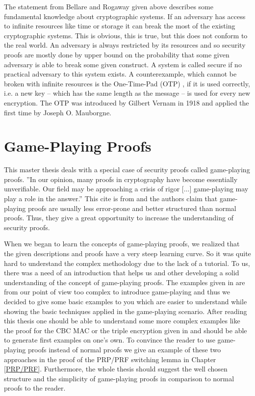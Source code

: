 The statement from Bellare and Rogaway given above describes some fundamental knowledge about cryptographic systems. If an adversary has access to
infinite resources like time or storage it can break the most of the existing cryptographic systems. This is obvious, this is true, but this does not conform to
the real world. An adversary is always restricted by its resources and so security proofs are mostly done by upper bound on the probability that some given
adversary is able to break some given construct. A system is called secure if no practical adversary to this system exists.
A counterexample, which cannot be broken with infinite resources is the One-Time-Pad (OTP) \cite{DBLP:books/sp/voecking2011/Tantau11}, if it is used correctly,
i.e. a new key -- which has the same length as the message -- is used for every new encryption.
The OTP was introduced by Gilbert Vernam in 1918 and applied the first time by Joseph O. Mauborgne.

\section*{Game-Playing Proofs}
This master thesis deals with a special case of security proofs called game-playing proofs. ''In our opinion, many proofs in cryptography have become
essentially unverifiable. Our field may be approaching a crisis of rigor [$\hdots$] game-playing may play a role in the answer.''
This cite is from \cite{DBLP:conf/eurocrypt/BellareR06} and the authors claim that game-playing proofs are usually less error-prone and better structured
than normal proofs. Thus, they give a great opportunity to increase the understanding of security proofs.

When we began to learn the concepts of game-playing proofs, we realized that the given descriptions and proofs have a very steep learning curve.
So it was quite hard to understand the complex methodology due to the lack of a tutorial. To us, there was a need of an introduction
that helps us and other developing a solid understanding of the concept of game-playing proofs. The examples given in \cite{DBLP:conf/eurocrypt/BellareR06}
are from our point of view too complex to introduce game-playing and thus we decided to give some basic examples to you which are easier to understand
while showing the basic techniques applied in the game-playing scenario. After reading this thesis one should be able to understand
some more complex examples like the proof for the CBC MAC or the triple encryption given in \cite{DBLP:conf/eurocrypt/BellareR06} and
should be able to generate first examples on one's own. To convince the reader to use game-playing proofs instead of normal proofs we give an example
of these two approaches in the proof of the PRP/PRF switching lemma in Chapter \ref{PRP/PRF}. Furthermore, the whole thesis should suggest the
well chosen structure and the simplicity of game-playing proofs in comparison to normal proofs to the reader.

